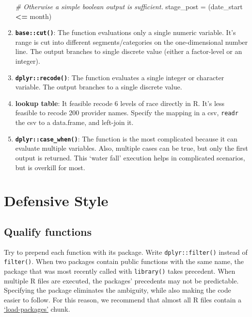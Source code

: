 \documentclass[
]{book}
\newenvironment{Shaded}{\begin{snugshade}}{\end{snugshade}}
\newcommand{\CommentTok}[1]{\textcolor[rgb]{0.56,0.35,0.01}{\textit{#1}}}
\newcommand{\NormalTok}[1]{#1}
\newcommand{\OperatorTok}[1]{\textcolor[rgb]{0.81,0.36,0.00}{\textbf{#1}}}
\newcommand{\StringTok}[1]{\textcolor[rgb]{0.31,0.60,0.02}{#1}}
\begin{document}
\begin{enumerate}
\begin{Shaded}
\begin{Highlighting}[]
\CommentTok{\# Otherwise a simple boolean output is sufficient.}
\NormalTok{stage\_post  =}\StringTok{ }\NormalTok{(date\_start }\OperatorTok{\textless{}=}\StringTok{ }\NormalTok{month)}
\end{Highlighting}
\end{Shaded}
\item
  \textbf{\texttt{base::cut()}}: The function evaluations only a single numeric variable. It's range is cut into different segments/categories on the one-dimensional number line. The output branches to single discrete value (either a factor-level or an integer).
\item
  \textbf{\texttt{dplyr::recode()}}: The function evaluates a single integer or character variable. The output branches to a single discrete value.
\item
  \textbf{lookup table}: It feasible recode 6 levels of race directly in R. It's less feasible to recode 200 provider names. Specify the mapping in a csv, \texttt{readr} the csv to a data.frame, and left-join it.
\item
  \textbf{\texttt{dplyr::case\_when()}}: The function is the most complicated because it can evaluate multiple variables. Also, multiple cases can be true, but only the first output is returned. This `water fall' execution helps in complicated scenarios, but is overkill for most.
\end{enumerate}

\hypertarget{coding-defensive}{%
\section{Defensive Style}\label{coding-defensive}}

\hypertarget{coding-defensive-qualify-functions}{%
\subsection{Qualify functions}\label{coding-defensive-qualify-functions}}

Try to prepend each function with its package. Write \texttt{dplyr::filter()} instead of \texttt{filter()}. When two packages contain public functions with the same name, the package that was most recently called with \texttt{library()} takes precedent. When multiple R files are executed, the packages' precedents may not be predictable. Specifying the package eliminates the ambiguity, while also making the code easier to follow. For this reason, we recommend that almost all R files contain a \protect\hyperlink{chunk-load-packages}{`load-packages'} chunk.
\end{document}
